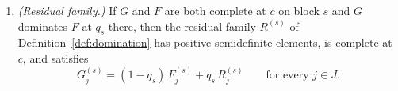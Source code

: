\begin{lemma}
\begin{enumerate}[label=(\roman*),leftmargin=2.4em]
  Put $G'_w\coloneqq\sum_{j\in J}P_{w|j}G_j$ and
  $F'_w\coloneqq\sum_{j\in J}P_{w|j}F_j$, block by block. If $G$ dominates
  $F$ at $q_s$ on block $s$, then $G'$ dominates $F'$ at the same $q_s$ on
  block $s$. If moreover $\sum_{w\in W}P_{w|j}=1$ for every $j$ and $G$ and
  $F$ are complete at $c$ on block $s$, then so are $G'$ and $F'$. In
  particular, multiplying each $G_j$ and $F_j$ by the same number $p_j\ge0$
  preserves domination at the same weight.
\item \emph{(Residual family.)} If $G$ and $F$ are both complete at $c$ on
  block $s$ and $G$ dominates $F$ at $q_s$ there, then the residual family
  $R^{(s)}$ of Definition~\ref{def:domination} has positive semidefinite
  elements, is complete at $c$, and satisfies
  \begin{equation}\label{eq:residual-mixture}
    G^{(s)}_j=(1-q_s)\,F^{(s)}_j+q_s\,R^{(s)}_j
    \qquad\text{for every }j\in J.
  \end{equation}
\end{enumerate}
\end{lemma}

